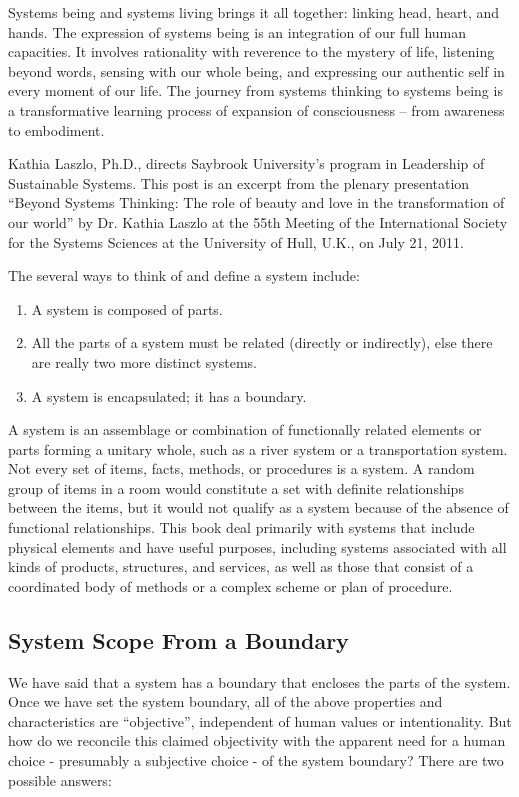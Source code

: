 Systems being and systems living brings it all together: linking head, heart, and hands. The expression of systems being is an integration of our full human capacities. It involves rationality with reverence to the mystery of life, listening beyond words, sensing with our whole being, and expressing our authentic self in every moment of our life. The journey from systems thinking to systems being is a transformative learning process of expansion of consciousness – from awareness to embodiment.

Kathia Laszlo, Ph.D., directs Saybrook University’s program in Leadership of Sustainable Systems. This post is an excerpt from the plenary presentation “Beyond Systems Thinking: The role of beauty and love in the transformation of our world” by Dr. Kathia Laszlo at the 55th Meeting of the International Society for the Systems Sciences at the University of Hull, U.K., on July 21, 2011.

The several ways to think of and define a system include:
\begin{enumerate}
\item A system is composed of parts.
\item All the parts of a system must be related (directly or indirectly), else there are really two more distinct systems.
\item A system is encapsulated; it has a boundary.
\end{enumerate}

A system is an assemblage or combination of functionally related elements or parts forming a unitary whole, such as a river system or a transportation system. Not every set of items, facts, methods, or procedures is a system. A random group of items in a room would constitute a set with definite relationships between the items, but it would not qualify as a system because of the absence of functional relationships. This book deal primarily with systems that include physical elements and have useful purposes, including systems associated with all kinds of products, structures, and services, as well as those that consist of a coordinated body of methods or a complex scheme or plan of procedure.

\subsection{System Scope From a Boundary}\label{subsec:systemScopeFromBoundary}

We have said that a system has a boundary that encloses the parts of the system. Once we have set the system boundary, all of the above properties and characteristics are ``objective'', independent of human values or intentionality. But how do we reconcile this claimed objectivity with the apparent need for a human choice - presumably a subjective choice - of the system boundary?  There are two possible answers:

